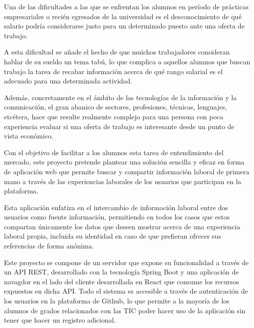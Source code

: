 \documentclass[a4paper, 12pt]{book}
\begin{document}
Una de las dificultades a las que se enfrentan los alumnos en período de prácticas empresariales o recién egresados de la universidad
es el desconocimiento de qué salario podría considerarse justo para un determinado puesto ante una oferta de trabajo.

A esta dificultad se añade el hecho de que muichos trabajadores consideran hablar de su sueldo un tema tabú,
lo que complica a aquellos alumnos que buscan trabajo la tarea de recabar información acerca de qué rango salarial es el adecuado para una determinada actividad.

Además, concretamente en el ámbito de las tecnologías de la información y la comunicación, el gran abanico de sectores, profesiones, técnicas, lenguajes, etcétera,
hace que resulte realmente complejo para una persona con poca experiencia evaluar si una oferta de trabajo es interesante desde un punto de vista económico.

Con el objetivo de facilitar a los alumnos esta tarea de entendimiento del mercado, este proyecto pretende plantear una solución sencilla y eficaz en forma de aplicación
web que permite buscar y compartir información laboral de primera mano a través de las experiencias laborales de los usuarios que participan en la plataforma.

Esta aplicación enfatiza en el intercambio de información laboral entre dos usuarios como fuente información, permitiendo en todos los casos que estos compartan únicamente los datos que deseen mostrar acerca de una experiencia laboral propia,
incluida su identidad en caso de que prefieran ofrecer sus referencias de forma anónima.

Este proyecto se compone de un servidor que expone su funcionalidad a través de un API REST, desarrollado con la tecnología Spring Boot y una aplicación de navagdor en el lado del cliente desarrollada en React que consume los recursos expuestos en dicha API.
Todo el sistema es accesible a través de autenticación de los usuarios en la plataforma de Github, lo que permite a la mayoría de los alumnos de grados relacionados con las TIC poder hacer uso de la aplicación sin tener que hacer un registro adicional.


\tableofcontents
\cleardoublepage
\listoffigures %
\end{document}
